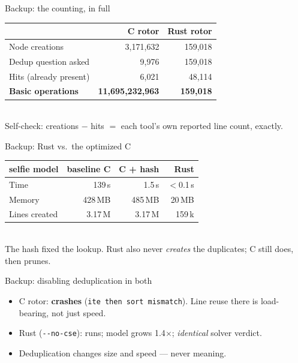 \documentclass[aspectratio=169]{beamer}
\newcommand{\lab}[1]{{\footnotesize\color{ink!65}#1}}
\begin{document}
\begin{frame}{Backup: the counting, in full}
  \centering\footnotesize
  \begin{tabular}{lrr}
    \toprule
     & C rotor & Rust rotor\\
    \midrule
    Node creations           & 3{,}171{,}632 & 159{,}018\\
    Dedup question asked      & 9{,}976       & 159{,}018\\
    Hits (already present)    & 6{,}021       & 48{,}114\\
    \textbf{Basic operations} & \textbf{11{,}695{,}232{,}963} & \textbf{159{,}018}\\
    \bottomrule
  \end{tabular}\\[0.6em]
  \lab{Self-check: creations $-$ hits $=$ each tool's own reported line count,
       exactly.}
\end{frame}

\begin{frame}{Backup: Rust vs.\ the optimized C}
  \centering\footnotesize
  \begin{tabular}{lrrr}
    \toprule
    selfie model & baseline C & C + hash & Rust\\
    \midrule
    Time          & 139\,s  & 1.5\,s  & $<$0.1\,s\\
    Memory        & 428\,MB & 485\,MB & 20\,MB\\
    Lines created & 3.17\,M & 3.17\,M & 159\,k\\
    \bottomrule
  \end{tabular}\\[0.6em]
  \lab{The hash fixed the lookup. Rust also never \emph{creates} the
       duplicates; C still does, then prunes.}
\end{frame}

\begin{frame}{Backup: disabling deduplication in both}
  \begin{itemize}\setlength\itemsep{0.5em}
    \item C rotor: \textbf{crashes} (\texttt{ite then sort mismatch}). Line
          reuse there is load-bearing, not just speed.
    \item Rust (\texttt{-{}-no-cse}): runs; model grows 1.4$\times$;
          \emph{identical} solver verdict.
    \item Deduplication changes size and speed --- never meaning.
  \end{itemize}
\end{frame}
\end{document}
